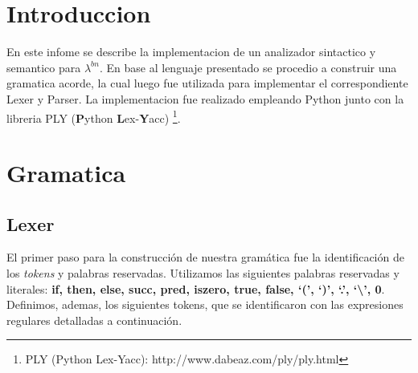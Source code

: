 \documentclass{article}
\theoremstyle{definition}
\theoremstyle{remark}
\begin{document}
{} %

 
 
\maketitle

\tableofcontents

\pagebreak

\section{Introduccion}

En este infome se describe la implementacion de un analizador sintactico y semantico para $\lambda^{bn}$. En base al lenguaje presentado se procedio a construir una gramatica acorde, la cual luego fue utilizada para implementar el correspondiente Lexer y Parser. La implementacion fue realizado empleando Python junto con la libreria PLY (\textbf{P}ython \textbf{L}ex-\textbf{Y}acc) \footnote{PLY (Python Lex-Yacc): http://www.dabeaz.com/ply/ply.html}.

\section{Gramatica}

\subsection{Lexer}

El primer paso para la construcción de nuestra gramática fue la identificación de los \emph{tokens} y palabras reservadas. Utilizamos las siguientes palabras reservadas y literales: \textbf{if, then, else, succ, pred, iszero, true, false, `(', `)', `.', `\textbackslash', 0}. Definimos, ademas, los siguientes tokens, que se identificaron con las expresiones regulares detalladas a continuación.
\end{document}
